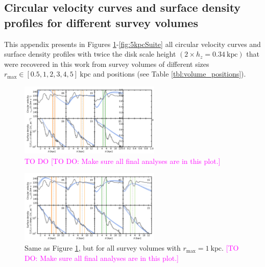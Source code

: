 \documentclass[iop,revtex4,numberedappendix,appendixfloats]{emulateapj}
\newcommand{\Wilma}[1]{\textcolor{Magenta}{#1}}
\begin{document}
{}


\begin{appendix}

\section{Circular velocity curves and surface density profiles for different survey volumes} \label{app:circsurf}

This appendix presents in Figures \ref{fig:500pcSuite}-\ref{fig:5kpcSuite} all circular velocity curves and surface density profiles with twice the disk scale height $(2\times h_z=0.34~\text{kpc})$ that were recovered in this work from survey volumes of different sizes $r_\text{max} \in [0.5,1,2,3,4,5]~\text{kpc}$ and positions (see Table \ref{tbl:volume_positions}). 

\begin{figure}[!htbp]
\centering
\includegraphics[width=0.6\textwidth]{fig/MNdHHdiffSph2_vcirc_surfdens_500pcSuite.pdf}
\caption{\Wilma{TO DO} \Wilma{[TO DO: Make sure all final analyses are in this plot.]}}
\label{fig:500pcSuite}
\end{figure}

\begin{figure}[!htbp]
\centering
\includegraphics[width=0.6\textwidth]{fig/MNdHHdiffSph2_vcirc_surfdens_1kpcSuite.pdf}
\caption{Same as Figure \ref{fig:500pcSuite}, but for all survey volumes with $r_\text{max}=1~\text{kpc}$. \Wilma{[TO DO: Make sure all final analyses are in this plot.]}}
\label{fig:????}
\end{figure}


\end{appendix}
\end{document}
